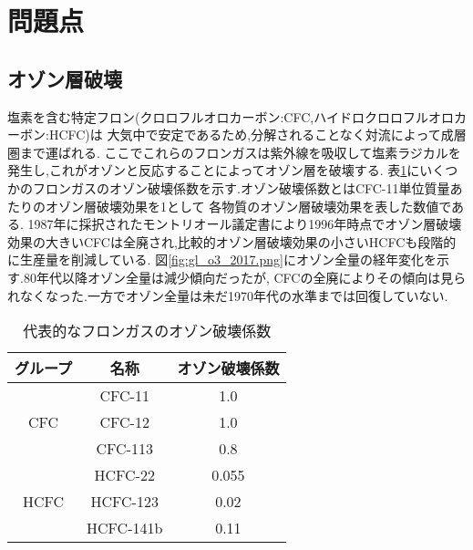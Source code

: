 \section{問題点}
\subsection{オゾン層破壊}
塩素を含む特定フロン(クロロフルオロカーボン:CFC,ハイドロクロロフルオロカーボン:HCFC)は
大気中で安定であるため,分解されることなく対流によって成層圏まで運ばれる.
ここでこれらのフロンガスは紫外線を吸収して塩素ラジカルを発生し,これがオゾンと反応することによってオゾン層を破壊する.\cite{気象庁フロンによ62:online}
表\ref{tab:ozone}にいくつかのフロンガスのオゾン破壊係数を示す.オゾン破壊係数とはCFC-11単位質量あたりのオゾン層破壊効果を1として
各物質のオゾン層破壊効果を表した数値である.
1987年に採択されたモントリオール議定書により1996年時点でオゾン層破壊効果の大きいCFCは全廃され,比較的オゾン層破壊効果の小さいHCFCも段階的に生産量を削減している.
図\ref{fig:gl_o3_2017.png}にオゾン全量の経年変化を示す.80年代以降オゾン全量は減少傾向だったが,
CFCの全廃によりその傾向は見られなくなった.一方でオゾン全量は未だ1970年代の水準までは回復していない.
\begin{table}[h]
   \caption{代表的なフロンガスのオゾン破壊係数\cite{平成１７年度オゾ26:online}}
   \label{tab:ozone}
   \centering
   \begin{tabular}{c|cc}
     \hline
     グループ&名称&オゾン破壊係数\\
     \hline \hline
     \multirow{3}{*}{CFC}&CFC-11&1.0\\
     &CFC-12&1.0\\
     &CFC-113&0.8\\
     \hline
     \multirow{3}{*}{HCFC}&HCFC-22&0.055\\
     &HCFC-123&0.02\\
     &HCFC-141b&0.11\\
     \hline
   \end{tabular}
\end{table}
